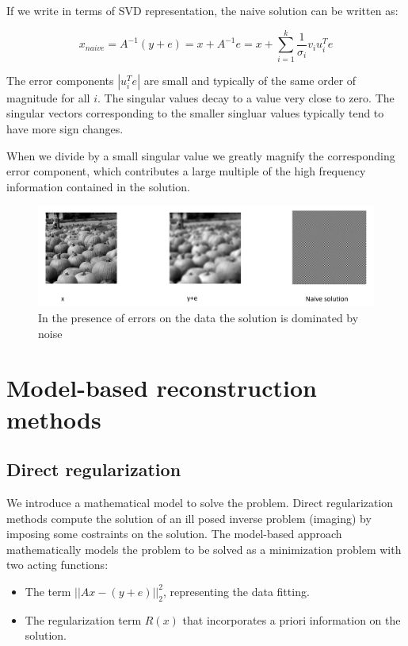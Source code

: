 \documentclass{article}
\begin{document}
If we write in terms of SVD representation, the naive solution can be written as:

$$x_{naive} = A^{-1} (y+e) = x + A^{-1} e = x + \sum_{i=1}^k \frac{1}{\sigma_i} v_i u_i^T e$$

The error components $|u_i^T e|$ are small and typically of the same order of magnitude for all $i$.
The singular values decay to a value very close to zero.
The singular vectors corresponding to the smaller singluar values typically tend to have more sign changes.

When we divide by a small singular value we greatly magnify the corresponding error component, which contributes a large multiple of the high frequency information contained in the solution.

\begin{figure}[htbp]
  \centering
  \includegraphics[width=0.7\linewidth]{./img/illposed_noise.jpg}
  \caption{In the presence of errors on the data the solution is dominated by noise}
  \label{fig:illposed_noise}
\end{figure}

\section{Model-based reconstruction methods}

\subsection{Direct regularization}

We introduce a mathematical model to solve the problem.
Direct regularization methods compute the solution of an ill posed inverse problem (imaging) by imposing some costraints on the solution.
The model-based approach mathematically models the problem to be solved as a minimization problem with two acting functions:
\begin{itemize}
  \item The term $||Ax - (y +e)||^2_2$, representing the data fitting.
  \item The regularization term $R(x)$ that incorporates a priori information on the solution.
\end{itemize}
\end{document}
